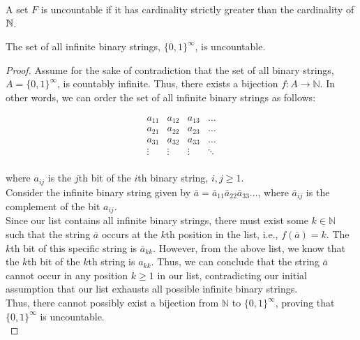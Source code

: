 \begin{definition}
    A set $F$ is uncountable if it has cardinality strictly greater than the cardinality of $\mathbb{N}$. \\
\end{definition}

\begin{theorem}
    The set of all infinite binary strings, $\{0, 1\}^\infty$, is uncountable.
\end{theorem}

\begin{proof}
    Assume for the sake of contradiction that the set of all binary strings, $A = \{0, 1\}^\infty$, is countably infinite. Thus, there exists a bijection $f: A \to \mathbb{N}$. In other words, we can order the set of all infinite binary strings as follows: 

\[
\begin{array}{cccc}
a_{11} & a_{12} & a_{13} & \ldots \\
a_{21} & a_{22} & a_{23} & \ldots \\
a_{31} & a_{32} & a_{33} & \ldots \\
\vdots & \vdots & \vdots & \ddots \\
\end{array}
\]

where $a_{ij}$ is the $j$th bit of the $i$th binary string, $i, j \geq 1$. \\

Consider the infinite binary string given by $\bar{a} = \bar{a}_{11} \bar{a}_{22} \bar{a}_{33} \ldots$, where $\bar{a}_{ij}$ is the complement of the bit $a_{ij}$. \\

Since our list contains all infinite binary strings, there must exist some $k \in \mathbb{N}$ such that the string $\bar{a}$ occurs at the $k$th position in the list, i.e., $f(\bar{a}) = k$. The $k$th bit of this specific string is $\bar{a}_{kk}$. However, from the above list, we know that the $k$th bit of the $k$th string is $a_{kk}$. Thus, we can conclude that the string $\bar{a}$ cannot occur in any position $k \geq 1$ in our list, contradicting our initial assumption that our list exhausts all possible infinite binary strings. \\

Thus, there cannot possibly exist a bijection from $\mathbb{N}$ to $\{0, 1\}^\infty$, proving that $\{0, 1\}^\infty$ is uncountable.\\
\end{proof}


